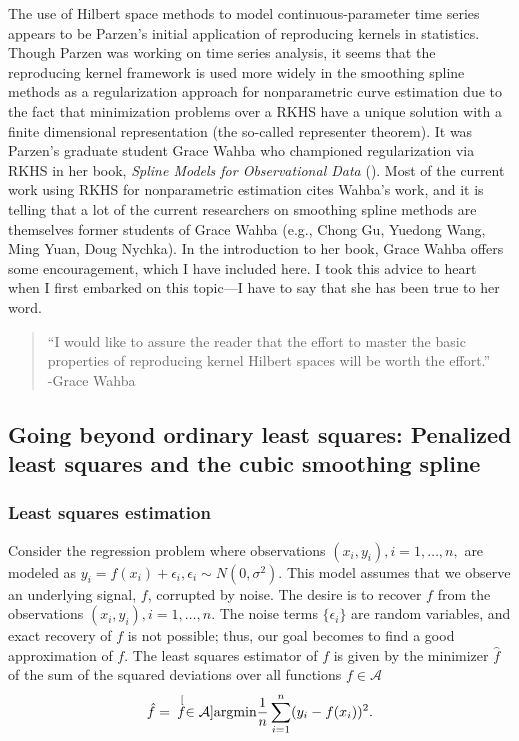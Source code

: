 The use of Hilbert space methods to model continuous-parameter time series appears to be Parzen's initial application of reproducing kernels in statistics. Though Parzen was working on time series analysis, it seems that the reproducing kernel framework is used more widely in the smoothing spline methods as a regularization approach for nonparametric curve estimation due to the fact that minimization problems over a RKHS have a unique solution with a finite dimensional representation (the so-called representer theorem). It was Parzen's graduate student Grace Wahba who championed regularization via RKHS in her book, \emph{Spline Models for Observational Data} (\cite{Wahba:1990}). Most of the current work using RKHS for nonparametric estimation cites Wahba's work, and it is telling that a lot of the current researchers on smoothing spline methods are themselves former students of Grace Wahba (e.g., Chong Gu, Yuedong Wang, Ming Yuan, Doug Nychka). In the introduction to her book, Grace Wahba offers some encouragement, which I have included here. I took this advice to heart when I first embarked on this topic---I have to say that she has been true to her word. 
\begin{quote}
``I would like to assure the reader that the effort to master the basic properties of reproducing kernel Hilbert spaces will be worth the effort.''\\
-Grace Wahba
\end{quote}

\subsection{Going beyond ordinary least squares: Penalized least squares and the cubic smoothing spline} 


\subsubsection{Least squares estimation}
Consider the regression problem where observations $(x_i, y_i), i=1,\dots,n,$ are modeled as $y_i = f(x_i) + \epsilon_i, \epsilon_i \sim N(0,\sigma^2).$ This model assumes that we observe an underlying signal, $f$, corrupted by noise. The desire is to recover $f$ from the observations $(x_i, y_i), i=1,\dots,n$. The noise terms $\{\epsilon_i\}$ are random variables, and exact recovery of $f$ is not possible; thus, our goal becomes to find a good approximation of $f$. The least squares estimator of $f$ is given by the minimizer $\hat{f}$ of the sum of the squared deviations over all functions $f \in \mathcal{A}$ 
\begin{equation*}
\hat{f} = \hspace{.07in} \stackrel[f \in \mathcal{A}]{}{\mbox{argmin}} \frac{1}{n}\sum_{i=1}^{n}(y_i - f(x_i))^2.
\label{eq:LS}
\end{equation*}

